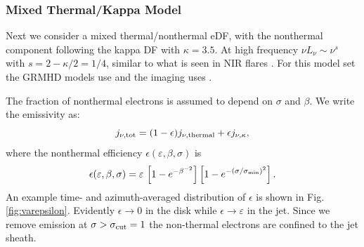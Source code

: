 



\subsubsection{Mixed Thermal/Kappa Model}

Next we consider a mixed thermal/nonthermal eDF, with the nonthermal component following the kappa DF with $\kappa = 3.5$.  At high frequency $\nu L_\nu \sim \nu^s$ with $s = 2 - \kappa/2 = 1/4$, similar to what is seen in NIR flares \citep{2007ApJ...667..900H}.  For this model set the GRMHD models use \bhac and the imaging uses \bhoss.

The fraction of nonthermal electrons is assumed to depend on $\sigma$ and $\beta$.  We write the emissivity as:
\begin{equation}
j_{\nu,\rm{tot}}=(1-\epsilon) j_{\nu,\rm{thermal}} + \epsilon j_{\nu, \kappa},
\label{eq:kappaeff}
\end{equation}
where the nonthermal efficiency $\epsilon( \varepsilon, \beta, \sigma)$ is
\begin{equation}
    \epsilon(\varepsilon,\beta,\sigma)=\varepsilon\,
    \left[1 - e^{-\beta^{-2}}\right]
    \left[1-e^{-(\sigma/\sigma_{\rm min})^2}\right].
    \label{eq:efficiencybetasigma}
\end{equation}
An example time- and azimuth-averaged distribution of $\epsilon$ is shown in Fig. \ref{fig:varepsilon}.  Evidently $\epsilon \rightarrow 0$ in the disk while $\epsilon \rightarrow \varepsilon$ in the jet.  Since we remove emission at $\sigma > \sigma_{\rm cut} = 1$ the non-thermal electrons are confined to the jet sheath.

